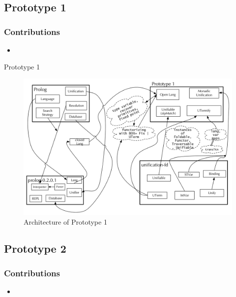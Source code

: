 \documentclass[hideothersubsections, t, aspectratio=1610]{beamer}
\begin{document}
\subsection{Prototype 1}
\begin{frame}
\frametitle{Contributions}
\begin{itemize}
\item
\end{itemize}
\end{frame}

\begin{frame}{Prototype 1}
\begin{figure}[H]
  \includegraphics[width=1\textwidth]{Prototype-1-architecture.jpeg}
  \caption{Architecture of Prototype 1}
  \label{fig:proto1-arch}
\end{figure}
\end{frame}


\subsection{Prototype 2}

\begin{frame}
\frametitle{Contributions}
\begin{itemize}
\item
\end{itemize}
\end{frame}
\end{document}
